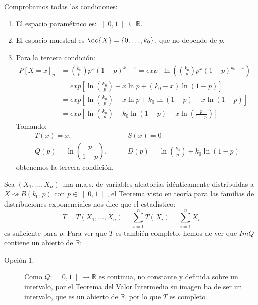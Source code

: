\begin{ejercicio}
\begin{enumerate}[label=\alph*)]
            Comprobamos todas las condiciones:
            \begin{enumerate}[label=\arabic*.]
                \item El espacio paramétrico es: $\left]0,1\right[\subseteq \mathbb{R}$.
                \item El espacio muestral es $\cc{X} = \{0,\ldots,k_0\}$, que no depende de $p$.
                \item Para la tercera condición:
                    \begin{align*}
                        P[X=x]_p &= \binom{k_0}{p} p^{x}{(1-p)}^{k_0-x} = exp\left[\ln\left(\binom{k_0}{p}p^{x}{(1-p)}^{k_0-x} \right)\right]\\
                               &= exp\left[\ln\binom{k_0}{p} + x\ln p + (k_0-x)\ln(1-p)\right] \\
                               &= exp\left[\ln\binom{k_0}{p} + x\ln p + k_0 \ln (1-p) - x\ln(1-p)\right] \\
                               &= exp\left[\ln\binom{k_0}{p} + k_0 \ln (1-p) + x\ln\left(\frac{p}{1-p}\right)\right] 
                    \end{align*}
                    Tomando:
                    \begin{align*}
                        T(x) = x, &\qquad S(x) = 0 \\
                        Q(p) = \ln\left(\dfrac{p}{1-p}\right), &\qquad D(p) = \ln\binom{k_0}{p} + k_0\ln(1-p)
                    \end{align*}
                    obtenemos la tercera condición. 
            \end{enumerate}
            Sea $(X_1, \ldots, X_n)$ una m.a.s. de variables aleatorias idénticamente distribuidas a $X\rightsquigarrow B(k_0,p)$ con $p\in \left]0,1\right[$, el Teorema visto en teoría para las familias de distribuciones exponenciales nos dice que el estadístico:
            \begin{equation*}
                T = T(X_1, \ldots, X_n) = \sum_{i=1}^{n}T(X_i) = \sum_{i=1}^{n}X_i
            \end{equation*}
            es suficiente para $p$. Para ver que $T$ es también completo, hemos de ver que $Im Q$ contiene un abierto de $\mathbb{R}$:
            \begin{description}
                \item [Opción 1.] Como $Q:\left]0,1\right[\to \mathbb{R}$ es continua, no constante y definida sobre un intervalo, por el Teorema del Valor Intermedio su imagen ha de ser un intervalo, que es un abierto de $\mathbb{R}$, por lo que $T$ es completo.

\end{description}
\end{enumerate}
\end{ejercicio}

